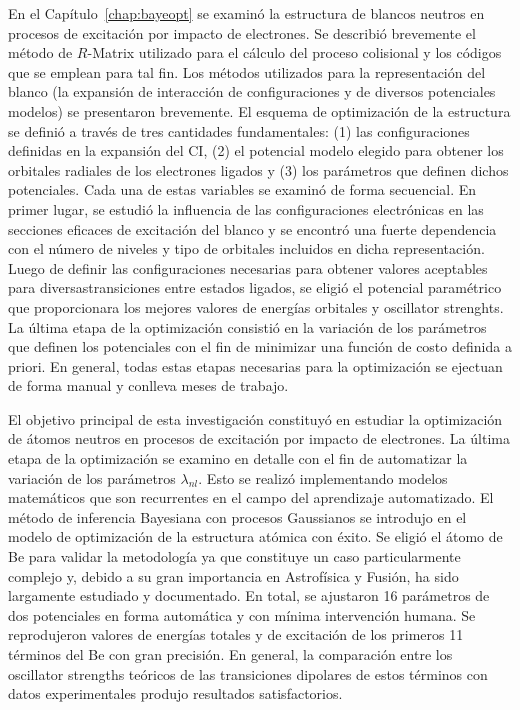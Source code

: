En el Capítulo~\ref{chap:bayeopt} se examinó la estructura de blancos 
neutros en procesos de excitación por impacto de electrones. Se 
describió brevemente el método de $R$-Matrix utilizado para el cálculo 
del proceso colisional y los códigos que se emplean para tal fin. 
Los métodos utilizados para la representación del blanco (la expansión 
de interacción de configuraciones y de diversos potenciales modelos) se
presentaron brevemente. 
El esquema de optimización de la estructura se definió a través de tres 
cantidades fundamentales: (1) las configuraciones definidas en la 
expansión del CI, (2) el potencial modelo elegido para obtener los 
orbitales radiales de los electrones ligados y (3) los parámetros que 
definen dichos potenciales. Cada una de estas variables se examinó de 
forma secuencial. En primer lugar, se estudió la influencia de las 
configuraciones electrónicas en las secciones eficaces de excitación del 
blanco y se encontró una fuerte dependencia con el número de niveles y 
tipo de orbitales incluidos en dicha representación. Luego de definir 
las configuraciones necesarias para obtener valores aceptables para 
diversastransiciones entre estados ligados, se eligió el potencial 
paramétrico que proporcionara los mejores valores de energías orbitales 
y oscillator strenghts. La última etapa de la optimización consistió en 
la variación de los parámetros que definen los potenciales con el fin de 
minimizar una función de costo definida a priori. En general, todas 
estas etapas necesarias para la optimización se ejectuan de forma manual 
y conlleva meses de trabajo. 

El objetivo principal de esta investigación constituyó en estudiar la 
optimización de átomos neutros en procesos de excitación por impacto de 
electrones. La última etapa de la optimización se examino en detalle con 
el fin de automatizar la variación de los parámetros $\lambda_{nl}$. 
Esto se realizó implementando modelos matemáticos que son recurrentes en 
el campo del aprendizaje automatizado. El método de inferencia Bayesiana 
con procesos Gaussianos se introdujo en el modelo de optimización de la 
estructura atómica con éxito. Se eligió el átomo de Be para validar la 
metodología ya que constituye un caso particularmente complejo y, debido 
a su gran importancia en Astrofísica y Fusión, ha sido largamente 
estudiado y documentado. En total, se ajustaron 16 parámetros de dos 
potenciales en forma automática y con mínima intervención humana. Se 
reprodujeron valores de energías totales y de excitación de los primeros 
11 términos del Be con gran precisión. En general, la comparación entre 
los oscillator strengths teóricos de las transiciones dipolares de estos 
términos con datos experimentales produjo resultados satisfactorios.

